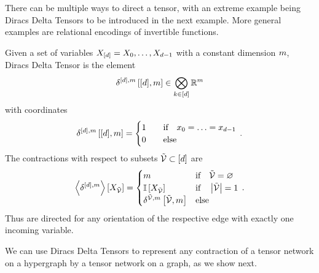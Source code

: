 There can be multiple ways to direct a tensor, with an extreme example being Diracs Delta Tensors to be introduced in the next example.
More general examples are relational encodings of invertible functions.

\begin{example}
    Given a set of variables $X_{[d]}=X_{0},\ldots,X_{d-1}$ with a constant dimension $m$, Diracs Delta Tensor is the element
    \begin{align*}
        \delta^{[d],m}\left[[d],m\right] \in \bigotimes_{k\in[d]} \mathbb{R}^{m}
    \end{align*}
    with coordinates
    \begin{align}
        \delta^{[d],m}\left[[d],m\right] =
        \begin{cases}
            1 \quad & \text{if} \quad x_{0} = \ldots = x_{d-1} \\
            0 & \text{else}
        \end{cases} \, .
    \end{align}
    The contractions with respect to subsets $\tilde{\mathcal{V}}\subset[d]$ are
    \begin{align}
        \left\langle \delta^{[d],m}\right\rangle \left[ X_{\tilde{\mathcal{V}}} \right] =
        \begin{cases}
            m & \text{if} \quad \tilde{\mathcal{V}} = \varnothing \\
            \mathbb{I}\left[X_{\tilde{\mathcal{V}}}\right] & \text{if} \quad \left|\tilde{\mathcal{V}}\right| = 1\\
            \delta^{\tilde{\mathcal{V}},m}\left[\tilde{\mathcal{V}},m\right] & \text{else}
        \end{cases} \, .
    \end{align}
    Thus are directed for any orientation of the respective edge with exactly one incoming variable.
\end{example}

We can use Diracs Delta Tensors to represent any contraction of a tensor network on a hypergraph by a tensor network on a graph, as we show next.

